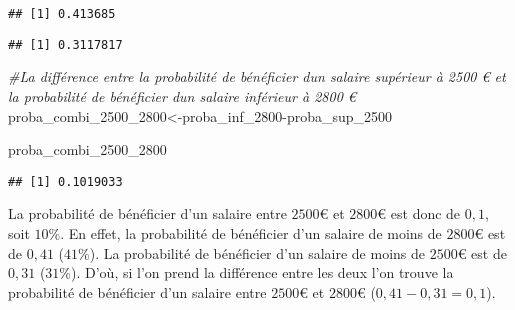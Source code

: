 \documentclass[
]{book}
\newenvironment{Shaded}{\begin{snugshade}}{\end{snugshade}}
\newcommand{\AttributeTok}[1]{\textcolor[rgb]{0.77,0.63,0.00}{#1}}
\newcommand{\CommentTok}[1]{\textcolor[rgb]{0.56,0.35,0.01}{\textit{#1}}}
\newcommand{\DecValTok}[1]{\textcolor[rgb]{0.00,0.00,0.81}{#1}}
\newcommand{\FunctionTok}[1]{\textcolor[rgb]{0.00,0.00,0.00}{#1}}
\newcommand{\NormalTok}[1]{#1}
\newcommand{\OtherTok}[1]{\textcolor[rgb]{0.56,0.35,0.01}{#1}}
\newcommand{\SpecialCharTok}[1]{\textcolor[rgb]{0.00,0.00,0.00}{#1}}
\begin{document}
\begin{verbatim}
## [1] 0.413685
\end{verbatim}

\begin{Shaded}
\end{Shaded}

\begin{verbatim}
## [1] 0.3117817
\end{verbatim}

\begin{Shaded}
\begin{Highlighting}[]
\CommentTok{\#La différence entre la probabilité de bénéficier d\textquotesingle{}un salaire supérieur à 2500 € et la probabilité de bénéficier d\textquotesingle{}un salaire inférieur à 2800 €}
\NormalTok{proba\_combi\_2500\_2800}\OtherTok{\textless{}{-}}\NormalTok{proba\_inf\_2800}\SpecialCharTok{{-}}\NormalTok{proba\_sup\_2500}

\NormalTok{proba\_combi\_2500\_2800}
\end{Highlighting}
\end{Shaded}

\begin{verbatim}
## [1] 0.1019033
\end{verbatim}

La probabilité de bénéficier d'un salaire entre \(2500€\) et \(2800€\) est donc de \(0,1\), soit \(10\%\). En effet, la probabilité de bénéficier d'un salaire de moins de \(2800€\) est de \(0,41\) (\(41\%\)). La probabilité de bénéficier d'un salaire de moins de \(2500€\) est de \(0,31\) (\(31\%\)). D'où, si l'on prend la différence entre les deux l'on trouve la probabilité de bénéficier d'un salaire entre \(2500€\) et \(2800€\) (\(0,41-0,31=0,1\)).
\end{document}
